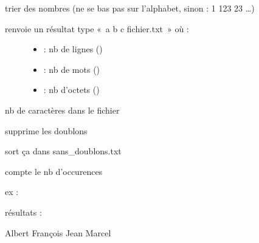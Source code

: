 \documentclass[letterpaper,10pt,french]{sphinxmanual}
\begin{document}
\begin{description}
\item[{}] \leavevmode
trier des nombres (ne se bas pas sur l’alphabet, sinon : 1 123 23 …)

\item[{}] \leavevmode\begin{description}
\item[{renvoie un résultat type « a b c fichier.txt » où :}] \leavevmode\begin{itemize}
\item {} 
 : nb de lignes ()

\item {} 
 : nb de mots ()

\item {} 
 : nb d’octets ()

\end{itemize}

\end{description}

\item[{}] \leavevmode
nb de caractères dans le fichier

\item[{}] \leavevmode
supprime les doublons

\item[{}] \leavevmode
sort ça dans sans\_doublons.txt

\item[{}] \leavevmode
compte le nb d’occurences
\begin{description}
\item[{ex :}] \leavevmode
{}

\end{description}

résultats :

%
\begin{sphinxVerbatim}[commandchars=\\\{\}]
 Albert
 François
 Jean
 Marcel
\end{sphinxVerbatim}


\end{description}
\end{document}
